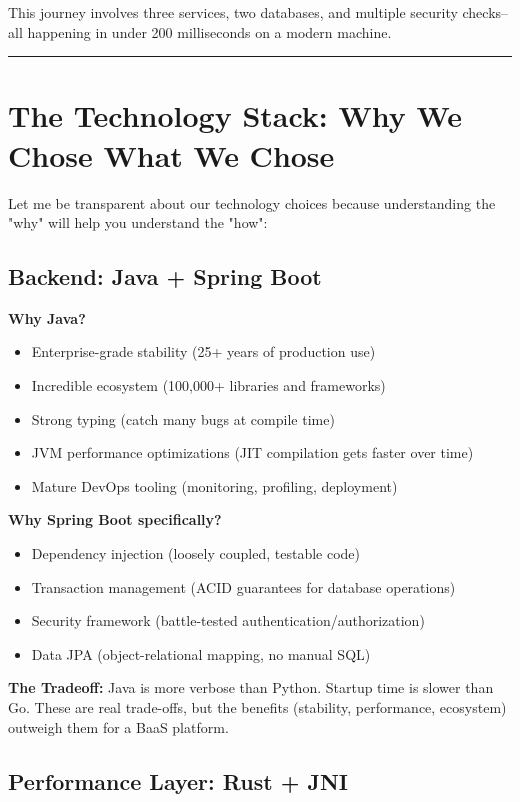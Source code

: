 \documentclass[11pt,a4paper]{report}
\begin{document}
This journey involves three services, two databases, and multiple security checks--all happening in under 200 milliseconds on a modern machine.


\vfill\hrule\vfill



\chapter{The Technology Stack: Why We Chose What We Chose}


Let me be transparent about our technology choices because understanding the "why" will help you understand the "how":


\section{Backend: Java + Spring Boot}


\textbf{Why Java?}
\begin{itemize}
\item Enterprise-grade stability (25+ years of production use)
\item Incredible ecosystem (100,000+ libraries and frameworks)
\item Strong typing (catch many bugs at compile time)
\item JVM performance optimizations (JIT compilation gets faster over time)
\item Mature DevOps tooling (monitoring, profiling, deployment)

\end{itemize}
\textbf{Why Spring Boot specifically?}
\begin{itemize}
\item Dependency injection (loosely coupled, testable code)
\item Transaction management (ACID guarantees for database operations)
\item Security framework (battle-tested authentication/authorization)
\item Data JPA (object-relational mapping, no manual SQL)

\end{itemize}
\textbf{The Tradeoff:} Java is more verbose than Python. Startup time is slower than Go. These are real trade-offs, but the benefits (stability, performance, ecosystem) outweigh them for a BaaS platform.


\section{Performance Layer: Rust + JNI}
\end{document}

